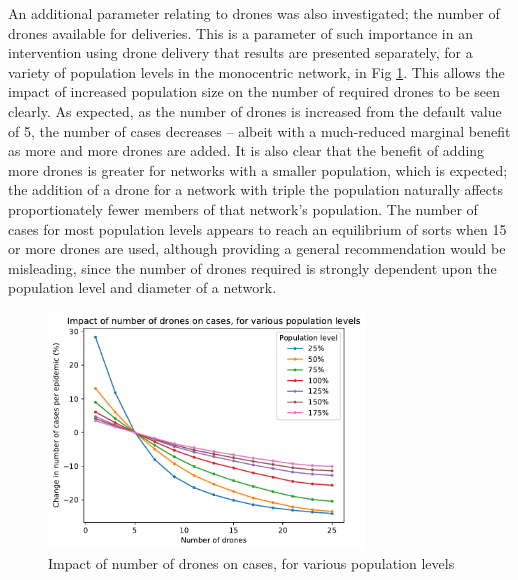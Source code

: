 \documentclass[10pt,letterpaper]{article}
\begin{document}
An additional parameter relating to drones was also investigated; the number of drones available for deliveries. This is a parameter of such importance in an intervention using drone delivery that results are presented separately, for a variety of population levels in the monocentric network, in Fig \ref{fig:sens_num_drones}. This allows the impact of increased population size on the number of required drones to be seen clearly. 
As expected, as the number of drones is increased from the default value of 5, the number of cases decreases -- albeit with a much-reduced marginal benefit as more and more drones are added. It is also clear that the benefit of adding more drones is greater for networks with a smaller population, which is expected; the addition of a drone for a network with triple the population naturally affects proportionately fewer members of that network's population. The number of cases for most population levels appears to reach an equilibrium of sorts when 15 or more drones are used, although providing a general recommendation would be misleading, since the number of drones required is strongly dependent upon the population level and diameter of a network.

\begin{figure}[ht!]{\textwidth}
\begin{center}
    \includegraphics[width=0.75\textwidth]{figures/sensitivity/numDrones.pdf}
    \caption{Impact of number of drones on cases, for various population levels} 
    \label{fig:sens_num_drones}
\end{center}
\end{figure}
\end{document}
